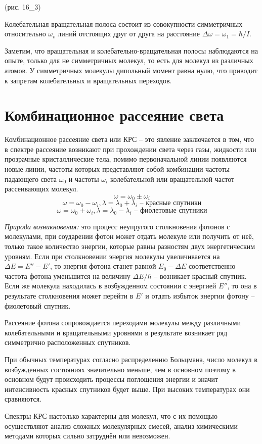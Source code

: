 (рис. 16\_3)

Колебательная вращательная полоса состоит из совокупности симметричных 
относительно \( \omega_v \) линий отстоящих друг от друга на расстояние 
\( \Delta\omega = \omega_1 = \hbar/I \).

Заметим, что вращательная и колебательно-вращательная полосы наблюдаются 
на опыте, только для не симметричных молекул, то есть для молекул из 
различных атомов. У симметричных молекулы дипольный момент равна нулю, 
что приводит к запретам колебательных и вращательных переходов.

\section{Комбинационное рассеяние света}
Комбинационное рассеяние света или КРС -- это явление заключается в том, 
что в спектре рассеяние возникают при прохождении света через газы, 
жидкости или прозрачные кристаллические тела, помимо первоначальной линии 
появляются новые линии, частоты которых представляют собой комбинации 
частоты падающего света \( \omega_0 \) и частоты \( \omega_i \) 
колебательной или вращательной частот рассеивающих молекул.
\[ \omega = \omega_0 \pm \omega_i \]
\[ 
    \omega = \omega_0 - \omega_i, \lambda = \lambda_0 + \lambda_i 
    \text{ -- красные спутники}
\]
\[ 
    \omega = \omega_0 + \omega_i, \lambda = \lambda_0 - \lambda_i
    \text{ -- фиолетовые спутники}
\]

\emph{Природа возникновения: } это процесс неупругого столкновения фотонов 
с молекулами, при соударении фотон может отдать молекуле или получить от 
неё, только такое количество энергии, которые равны разностям двух 
энергетическим уровням. Если при столкновении энергия молекулы 
увеличивается на \( \Delta E = E'' - E' \), то энергия фотона станет 
равной \( E_0 - \Delta E \) соответственно частота фотона уменьшится на 
величину \( \Delta E / \hbar \) -- возникает красный спутник. Если же 
молекула находилась в возбужденном состоянии с энергией \( E'' \), то 
она в результате столкновения может перейти в \( E' \) и отдать избыток 
энергии фотону -- фиолетовый спутник.

Рассеяние фотона сопровождается переходами молекулы между различными 
колебательными и вращательными уровнями в результате возникает ряд 
симметрично расположенных спутников. 

При обычных температурах согласно распределению Больцмана, число молекул 
в возбужденных состояниях значительно меньше, чем в основном поэтому в 
основном будут происходить процессы поглощения энергии и значит 
интенсивность красных спутников будет выше. При высоких температурах 
они сравняются.

Спектры КРС настолько характерны для молекул, что с их помощью осуществляют 
анализ сложных молекулярных смесей, анализ химическими методами 
которых сильно затруднён или невозможен.


\newpage
